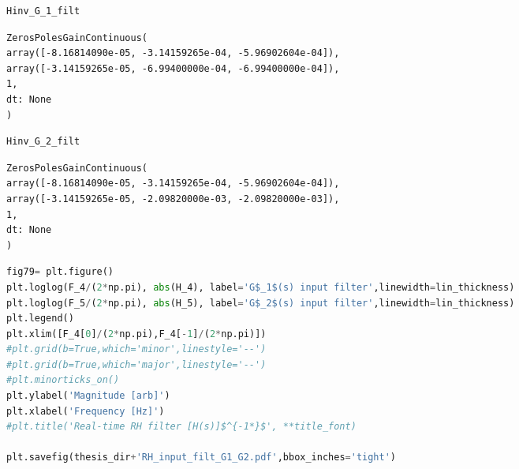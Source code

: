 
\begin{spacing}{1.2} \begin{lstlisting}[frame=single,language=Python]
Hinv_G_1_filt
\end{lstlisting} \end{spacing}

\begin{spacing}{1.2} \begin{lstlisting}[frame=single]
ZerosPolesGainContinuous(
array([-8.16814090e-05, -3.14159265e-04, -5.96902604e-04]),
array([-3.14159265e-05, -6.99400000e-04, -6.99400000e-04]),
1,
dt: None
)
\end{lstlisting} \end{spacing}

\begin{spacing}{1.2} \begin{lstlisting}[frame=single,language=Python]
Hinv_G_2_filt
\end{lstlisting} \end{spacing}

\begin{spacing}{1.2} \begin{lstlisting}[frame=single]
ZerosPolesGainContinuous(
array([-8.16814090e-05, -3.14159265e-04, -5.96902604e-04]),
array([-3.14159265e-05, -2.09820000e-03, -2.09820000e-03]),
1,
dt: None
)
\end{lstlisting} \end{spacing}

\begin{spacing}{1.2} \begin{lstlisting}[frame=single,language=Python]
fig79= plt.figure()
plt.loglog(F_4/(2*np.pi), abs(H_4), label='G$_1$(s) input filter',linewidth=lin_thickness)
plt.loglog(F_5/(2*np.pi), abs(H_5), label='G$_2$(s) input filter',linewidth=lin_thickness)
plt.legend()
plt.xlim([F_4[0]/(2*np.pi),F_4[-1]/(2*np.pi)])
#plt.grid(b=True,which='minor',linestyle='--')
#plt.grid(b=True,which='major',linestyle='--')
#plt.minorticks_on()
plt.ylabel('Magnitude [arb]')
plt.xlabel('Frequency [Hz]')
#plt.title('Real-time RH filter [H(s)]$^{-1*}$', **title_font)

plt.savefig(thesis_dir+'RH_input_filt_G1_G2.pdf',bbox_inches='tight')
\end{lstlisting} \end{spacing}

